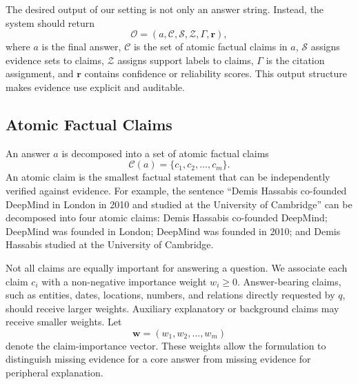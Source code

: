 The desired output of our setting is not only an answer string. Instead, the system should return
\begin{equation}
    \mathcal{O} = (a, \mathcal{C}, \mathcal{S}, \mathcal{Z}, \Gamma, \mathbf{r}),
\end{equation}
where $a$ is the final answer, $\mathcal{C}$ is the set of atomic factual claims in $a$, $\mathcal{S}$ assigns evidence sets to claims, $\mathcal{Z}$ assigns support labels to claims, $\Gamma$ is the citation assignment, and $\mathbf{r}$ contains confidence or reliability scores. This output structure makes evidence use explicit and auditable.

\subsection{Atomic Factual Claims}
\label{subsec:atomic_claims}

An answer $a$ is decomposed into a set of atomic factual claims
\begin{equation}
    \mathcal{C}(a) = \{c_1, c_2, \ldots, c_m\}.
\end{equation}
An atomic claim is the smallest factual statement that can be independently verified against evidence. For example, the sentence ``Demis Hassabis co-founded DeepMind in London in 2010 and studied at the University of Cambridge'' can be decomposed into four atomic claims: Demis Hassabis co-founded DeepMind; DeepMind was founded in London; DeepMind was founded in 2010; and Demis Hassabis studied at the University of Cambridge.

Not all claims are equally important for answering a question. We associate each claim $c_i$ with a non-negative importance weight $w_i \geq 0$. Answer-bearing claims, such as entities, dates, locations, numbers, and relations directly requested by $q$, should receive larger weights. Auxiliary explanatory or background claims may receive smaller weights. Let
\begin{equation}
    \mathbf{w} = (w_1, w_2, \ldots, w_m)
\end{equation}
denote the claim-importance vector. These weights allow the formulation to distinguish missing evidence for a core answer from missing evidence for peripheral explanation.

